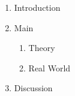 \documentclass{article}
\begin{document}
	
	\begin{enumerate}
		\item Introduction
		\item Main
		\begin{enumerate}[label=\theenumi.\arabic*]
			\item Theory
			\item Real World
		\end{enumerate}
		\item Discussion
	\end{enumerate}
	
\end{document}
